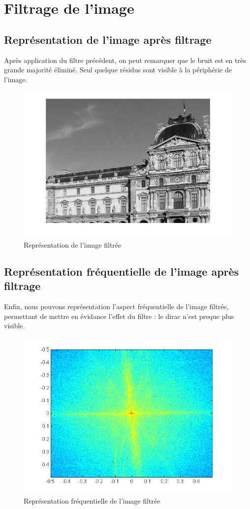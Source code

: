 \documentclass[11pt]{article}
\begin{document}
\section{Filtrage de l'image}
	
	\subsection{Représentation de l'image après filtrage}
	
	Après application du filtre précédent, on peut remarquer que le bruit est en très grande majorité éliminé. Seul quelque résidus sont visible à la périphérie de l'image.
	
	\begin{figure}[H]
			\centering
			\includegraphics[scale=0.6]{img/monument_filtre.png}
			\caption{Représentation de l'image filtrée}
			\label{monument_filtre}
		\end{figure}


	\subsection{Représentation fréquentielle de l'image après filtrage}
	
	Enfin, nous pouvons représentation l'aspect fréquentielle de l'image filtrée, permettant de mettre en évidance l'effet du filtre : le dirac n'est preque plus visible.
	
	\begin{figure}[h]
			\centering
			\includegraphics[scale=0.7]{img/img6.png}
			\caption{Représentation fréquentielle de l'image filtrée}
			\label{img6}
		\end{figure}
\end{document}

